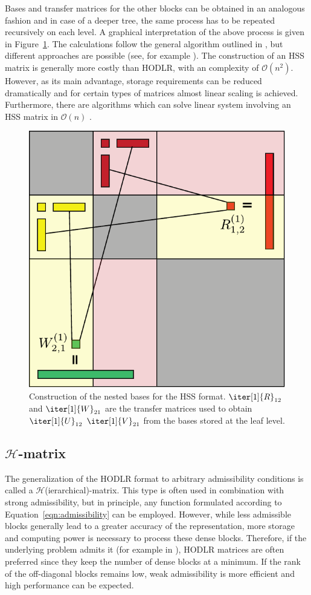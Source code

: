 \noindent Bases and transfer matrices for the other blocks can be obtained in an analogous fashion and in case of a deeper tree, the same process has to be repeated recursively on each level. A graphical interpretation of the above process is given in Figure~\hyperref[fig:nested_bases]{\ref{fig:nested_bases}}. The calculations follow the general algorithm outlined in \cite{xia_fast_2010}, but different approaches are possible (see, for example \cite{martinsson_fast_2011}). The construction of an HSS matrix is generally more costly than HODLR, with an complexity of $\mathcal{O}(n^2)$. However, as its main advantage, storage requirements can be reduced dramatically and for certain types of matrices almost linear scaling is achieved. Furthermore, there are algorithms which can solve linear system involving an HSS matrix in $\mathcal{O}(n)$ \cite{chandrasekaran_fast_2006}.

\begin{figure}[h]
    \centering
    \includegraphics[width=0.6\linewidth]{chapters/4_hierarchical_matrices/figures/nested_basis.pdf}
    \caption[Nested Bases Construction]{Construction of the nested bases for the HSS format. $\iter[1]{R}_{12}$ and $\iter[1]{W}_{21}$ are the transfer matrices used to obtain $\iter[1]{U}_{12}$ $\iter[1]{V}_{21}$ from the bases stored at the leaf level.}
    \label{fig:nested_bases}
\end{figure}

\subsection{\texorpdfstring{$\mathcal{H}$}{H}-matrix}
\label{sec:h_matrix}
The generalization of the HODLR format to arbitrary admissibility conditions is called a $\mathcal{H}$(ierarchical)-matrix. This type is often used in combination with strong admissibility, but in principle, any function formulated according to Equation~\hyperref[eqn:admissibility]{\ref{eqn:admissibility}} can be employed. However, while less admissible blocks generally lead to a greater accuracy of the representation, more storage and computing power is necessary to process these dense blocks. Therefore, if the underlying problem admits it (for example in \cite{ambikasaran_fast_2016}), HODLR matrices are often preferred since they keep the number of dense blocks at a minimum. If the rank of the off-diagonal blocks remains low, weak admissibility is more efficient and high performance can be expected.

